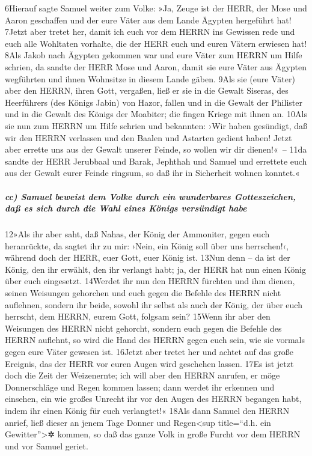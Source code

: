 6Hierauf sagte Samuel weiter zum Volke: »Ja, Zeuge ist der HERR, der
Mose und Aaron geschaffen und der eure Väter aus dem Lande Ägypten
hergeführt hat! 7Jetzt aber tretet her, damit ich euch vor dem HERRN ins
Gewissen rede und euch alle Wohltaten vorhalte, die der HERR euch und
euren Vätern erwiesen hat! 8Als Jakob nach Ägypten gekommen war und eure
Väter zum HERRN um Hilfe schrien, da sandte der HERR Mose und Aaron,
damit sie eure Väter aus Ägypten wegführten und ihnen Wohnsitze in
diesem Lande gäben. 9Als sie (eure Väter) aber den HERRN, ihren Gott,
vergaßen, ließ er sie in die Gewalt Siseras, des Heerführers (des Königs
Jabin) von Hazor, fallen und in die Gewalt der Philister und in die
Gewalt des Königs der Moabiter; die fingen Kriege mit ihnen an. 10Als
sie nun zum HERRN um Hilfe schrien und bekannten: ›Wir haben gesündigt,
daß wir den HERRN verlassen und den Baalen und Astarten gedient haben!
Jetzt aber errette uns aus der Gewalt unserer Feinde, so wollen wir dir
dienen!«~-- 11da sandte der HERR Jerubbaal und Barak, Jephthah und
Samuel und errettete euch aus der Gewalt eurer Feinde ringsum, so daß
ihr in Sicherheit wohnen konntet.«

\hypertarget{cc-samuel-beweist-dem-volke-durch-ein-wunderbares-gotteszeichen-dauxdf-es-sich-durch-die-wahl-eines-kuxf6nigs-versuxfcndigt-habe}{%
\subparagraph{cc) Samuel beweist dem Volke durch ein wunderbares
Gotteszeichen, daß es sich durch die Wahl eines Königs versündigt
habe}\label{cc-samuel-beweist-dem-volke-durch-ein-wunderbares-gotteszeichen-dauxdf-es-sich-durch-die-wahl-eines-kuxf6nigs-versuxfcndigt-habe}}

12»Als ihr aber saht, daß Nahas, der König der Ammoniter, gegen euch
heranrückte, da sagtet ihr zu mir: ›Nein, ein König soll über uns
herrschen!‹, während doch der HERR, euer Gott, euer König ist. 13Nun
denn -- da ist der König, den ihr erwählt, den ihr verlangt habt; ja,
der HERR hat nun einen König über euch eingesetzt. 14Werdet ihr nun den
HERRN fürchten und ihm dienen, seinen Weisungen gehorchen und euch gegen
die Befehle des HERRN nicht auflehnen, sondern ihr beide, sowohl ihr
selbst als auch der König, der über euch herrscht, dem HERRN, eurem
Gott, folgsam sein? 15Wenn ihr aber den Weisungen des HERRN nicht
gehorcht, sondern euch gegen die Befehle des HERRN auflehnt, so wird die
Hand des HERRN gegen euch sein, wie sie vormals gegen eure Väter gewesen
ist. 16Jetzt aber tretet her und achtet auf das große Ereignis, das der
HERR vor euren Augen wird geschehen lassen. 17Es ist jetzt doch die Zeit
der Weizenernte; ich will aber den HERRN anrufen, er möge Donnerschläge
und Regen kommen lassen; dann werdet ihr erkennen und einsehen, ein wie
großes Unrecht ihr vor den Augen des HERRN begangen habt, indem ihr
einen König für euch verlangtet!« 18Als dann Samuel den HERRN anrief,
ließ dieser an jenem Tage Donner und Regen\textless sup title=``d.h. ein
Gewitter''\textgreater✲ kommen, so daß das ganze Volk in große Furcht
vor dem HERRN und vor Samuel geriet.

